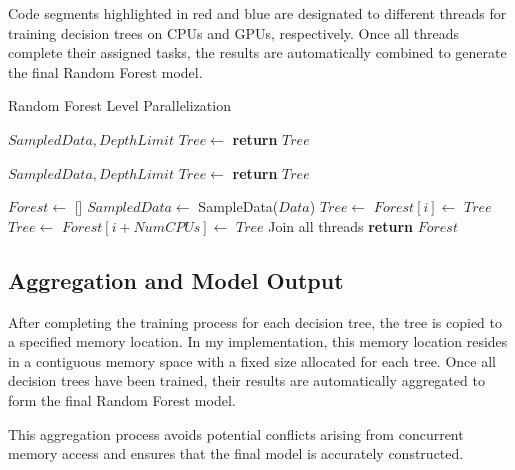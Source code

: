 \documentclass[13pt]{article}
\begin{document}
Code segments highlighted in red and blue are designated to different threads for training decision trees on CPUs and GPUs, respectively. Once all threads complete their assigned tasks, the results are automatically combined to generate the final Random Forest model.
\begin{algorithm}[ht]
    \caption{Random Forest Level Parallelization}\label{alg:randomforest}
    \begin{algorithmic}[1]
     {$SampledData, DepthLimit$}
        \State $Tree \gets$ 
        \State \textbf{return} $Tree$
    \EndProcedure

    \State
     {$SampledData, DepthLimit$}
        \State $Tree \gets$ 
        \State \textbf{return} $Tree$
    \EndProcedure
       
    \State
        \State $Forest \gets$ []
        \State $SampledData \gets$ SampleData($Data$)
        \color{red} 
            \State $Tree \gets$ 
            \State $Forest[i] \gets$ $Tree$
        \EndFor \color{black}
        \color{blue} 
            \State $Tree \gets$ 
            \State $Forest[i + NumCPUs] \gets$ $Tree$
        \EndFor \color{black}
        \State Join all threads
        \State \textbf{return} $Forest$
    \EndProcedure
    \end{algorithmic}
\end{algorithm}

\subsection{Aggregation and Model Output}
After completing the training process for each decision tree, the tree is copied to a specified memory location. In my implementation, this memory location resides in a contiguous memory space with a fixed size allocated for each tree. Once all decision trees have been trained, their results are automatically aggregated to form the final Random Forest model.

This aggregation process avoids potential conflicts arising from concurrent memory access and ensures that the final model is accurately constructed.
\end{document}
